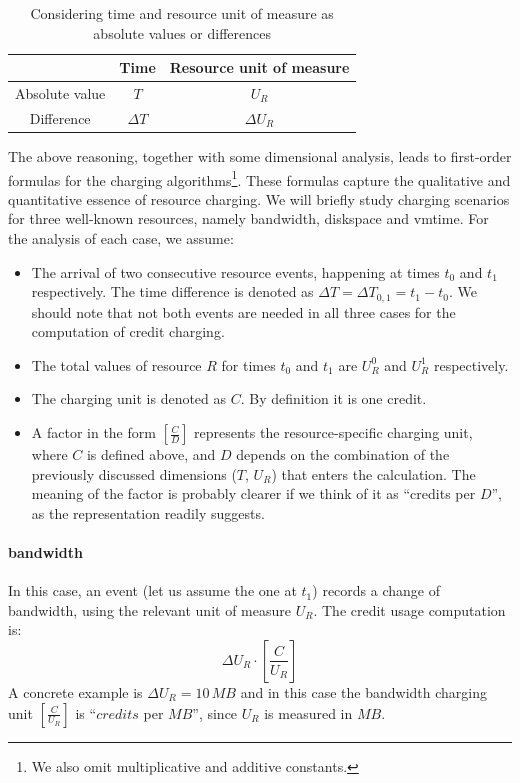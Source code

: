 \documentclass[preprint,10pt]{sigplanconf}
\newcommand{\DTime}{\ensuremath{T}\xspace} %
\newcommand{\DeltaDTime}{\ensuremath{\Delta{T}}\xspace}
\newcommand{\DUnitR}{\ensuremath{U_{R}}\xspace} %
\newcommand{\DeltaDUnitR}{\ensuremath{\Delta U_{R}}\xspace}
\newcommand{\MB}[1]{\ensuremath{#1\,MB}}
\begin{document}
\begin{table}[htdp]
\label{tab:dt}
\begin{center}
\begin{tabular}{|c|c|c|}
\hline
&Time & Resource unit of measure \\
\hline
Absolute value & \DTime & \DUnitR \\
Difference & \DeltaDTime  & \DeltaDUnitR \\
\hline
\end{tabular}
\end{center}
\label{default}
\caption{Considering time and resource unit of measure as absolute values or differences
}
\end{table}%

The above reasoning, together with some dimensional analysis, leads to first-order formulas for the charging algorithms\footnote{We also omit multiplicative and additive constants.}. These formulas capture the qualitative and quantitative essence of resource charging. We will briefly  study charging scenarios for three well-known resources, namely \textsf{bandwidth}, \textsf{diskspace} and \textsf{vmtime}. For the analysis of each case, we assume: 
\begin{itemize}
\item The arrival of two consecutive resource events, happening at times $t_0$ and $t_1$ respectively. The time difference is denoted as $\Delta T = \Delta T_{0, 1} = t_1 - t_0$. We should note that not both events are needed in all three cases for the computation of credit charging.

\item The total values of resource $R$ for times $t_0$ and $t_1$ are $U_R^0$ and $U_R^1$ respectively.

\item The charging unit is denoted as $C$. By definition it is one credit.

\item A factor in the form $[\frac{C}{D}]$ represents the resource-specific charging unit, where $C$ is defined above, and $D$ depends on the combination of the previously discussed dimensions ($T$, $U_R$) that enters the calculation. The meaning of the factor is probably clearer if we think of it as ``credits per $D$'', as the representation readily suggests.
\end{itemize}

\paragraph{\textsf{bandwidth}}
In this case, an event (let us assume the one at $t_1$) records a change of bandwidth, using the relevant unit of measure $U_R$.  The credit usage computation is:
\begin{equation}
\label{eq:bandwidth}
\Delta U_R \cdot  [ \frac{C}{U_R} ]
\end{equation}
A concrete example is $\Delta U_R = \MB{10}$ and in this case the bandwidth charging unit $[ \frac{C}{U_R} ]$ is ``$credits$ per $MB$'', since $U_R$ is measured in $MB$.
\end{document}
